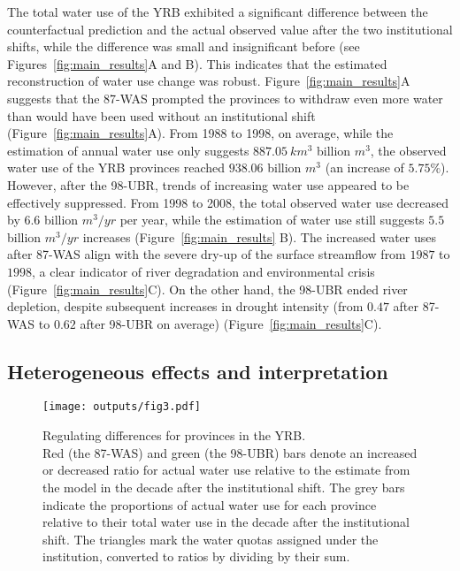The total water use of the YRB exhibited a significant difference between the counterfactual prediction and the actual observed value after the two institutional shifts, while the difference was small and insignificant before (see Figures~\ref{fig:main_results}A and B). This indicates that the estimated reconstruction of water use change was robust.
Figure~\ref{fig:main_results}A suggests that the 87-WAS prompted the provinces to withdraw even more water than would have been used without an institutional shift (Figure~\ref{fig:main_results}A).
From 1988 to 1998, on average, while the estimation of annual water use only suggests $887.05~km^3$ billion $m^3$, the observed water use of the YRB provinces reached $938.06$ billion $m^3$ (an increase of $5.75\%$).
However, after the 98-UBR, trends of increasing water use appeared to be effectively suppressed.
From 1998 to 2008, the total observed water use decreased by $6.6$ billion $m^3/yr$ per year, while the estimation of water use still suggests $5.5$ billion $m^3/yr$ increases (Figure~\ref{fig:main_results} B).
The increased water uses after 87-WAS align with the severe dry-up of the surface streamflow from $1987$ to $1998$, a clear indicator of river degradation and environmental crisis (Figure~\ref{fig:main_results}C).
On the other hand, the 98-UBR ended river depletion, despite subsequent increases in drought intensity (from $0.47$ after 87-WAS to $0.62$ after 98-UBR on average) (Figure~\ref{fig:main_results}C).

\subsection{Heterogeneous effects and interpretation}\label{result-3}

\begin{figure*}[!htb]
	\centering
	\texttt{[image: outputs/fig3.pdf]}
	\caption{
		Regulating differences for provinces in the YRB.\\
		Red (the 87-WAS) and green (the 98-UBR) bars denote an increased or decreased ratio for actual water use relative to the estimate from the model in the decade after the institutional shift.
		The grey bars indicate the proportions of actual water use for each province relative to their total water use in the decade after the institutional shift.
		The triangles mark the water quotas assigned under the institution, converted to ratios by dividing by their sum.
	}\label{fig:regulating}
\end{figure*}

